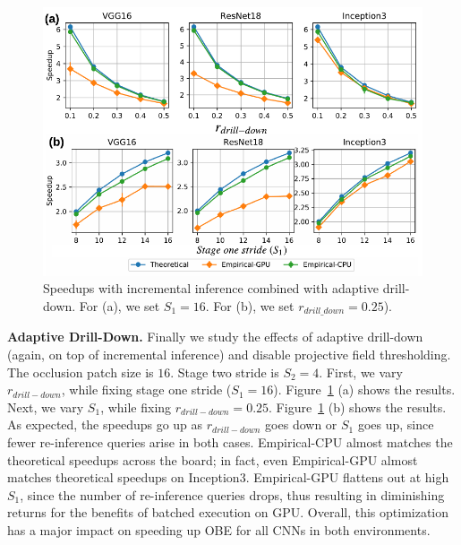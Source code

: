 \begin{figure}[t]
\includegraphics[width=\columnwidth]{images/5_2_3_edited}
\vspace{-8mm}
\caption{Speedups with incremental inference combined with adaptive drill-down. For (a), we set $S_1=16$. For (b), we set $r_{drill\_down}=0.25$).}
\vspace{-2mm}
\label{fig:5_2_3_edited}
\end{figure}

\vspace{2mm}
\noindent \textbf{Adaptive Drill-Down.} Finally we study the effects of adaptive drill-down (again, on top of incremental inference) and disable projective field thresholding. The occlusion patch size is $16$. Stage two stride is $S_2 = 4$. First, we vary $r_{drill-down}$, while fixing stage one stride ($S_1 = 16$). Figure~\ref{fig:5_2_3_edited} (a) shows the results. Next, we vary $S_1$, while fixing $r_{drill-down} = 0.25$. Figure~\ref{fig:5_2_3_edited} (b) shows the results. As expected, the speedups go up as $r_{drill-down}$ goes down or $S_1$ goes up, since fewer re-inference queries arise in both cases. Empirical-CPU almost matches the theoretical speedups across the board; in fact, even Empirical-GPU almost matches theoretical speedups on Inception3. Empirical-GPU flattens out at high $S_1$, since the number of re-inference queries drops, thus resulting in diminishing returns for the benefits of batched execution on GPU. Overall, this optimization has a major impact on speeding up OBE for all CNNs in both environments.


\vspace{2mm}
\noindent \textbf{} 

